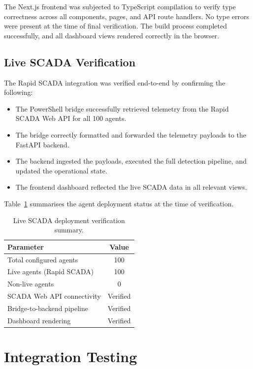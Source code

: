 The Next.js frontend was subjected to TypeScript compilation to verify type correctness across all components, pages, and API route handlers. No type errors were present at the time of final verification. The build process completed successfully, and all dashboard views rendered correctly in the browser.

\subsection{Live SCADA Verification}

The Rapid SCADA integration was verified end-to-end by confirming the following:

\begin{itemize}
    \item The PowerShell bridge successfully retrieved telemetry from the Rapid SCADA Web API for all 100 agents.
    \item The bridge correctly formatted and forwarded the telemetry payloads to the FastAPI backend.
    \item The backend ingested the payloads, executed the full detection pipeline, and updated the operational state.
    \item The frontend dashboard reflected the live SCADA data in all relevant views.
\end{itemize}

\noindent
Table~\ref{tab:live_verification} summarises the agent deployment status at the time of verification.

\begin{table}[H]
\centering
\caption{Live SCADA deployment verification summary.}
\label{tab:live_verification}
\begin{tabular}{|l|c|}
\hline
\textbf{Parameter} & \textbf{Value} \\ \hline
Total configured agents & 100 \\ \hline
Live agents (Rapid SCADA) & 100 \\ \hline
Non-live agents & 0 \\ \hline
SCADA Web API connectivity & Verified \\ \hline
Bridge-to-backend pipeline & Verified \\ \hline
Dashboard rendering & Verified \\ \hline
\end{tabular}
\end{table}


\section{Integration Testing}

